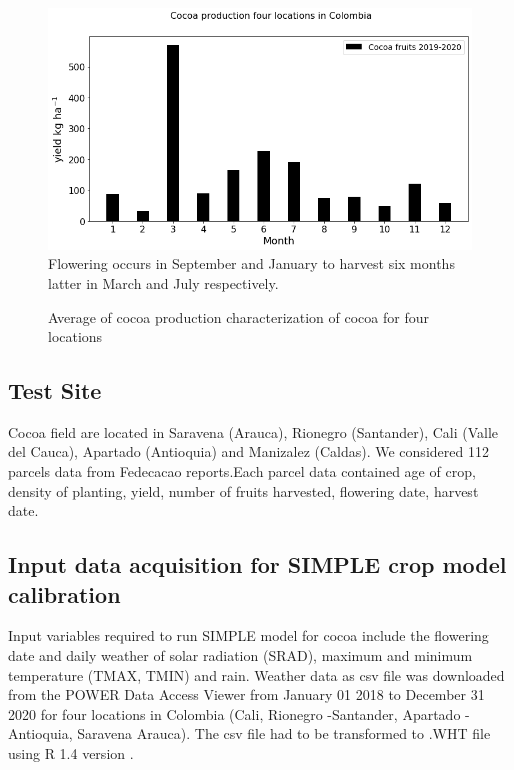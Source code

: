 \documentclass[gene,journal,article,submit,moreauthors,pdftex]{Definitions/mdpi}
\begin{document}
\begin{figure}[h]
	\centering
	\caption{\footnotesize {Average of cocoa production characterization of cocoa for four locations\\}}
	\includegraphics[scale=0.35]{images/yieldmonth.png}\\
	{\footnotesize Flowering occurs in September and January to harvest six months latter in March and July respectively.}
	\label{fig:yield}
\end{figure}
\newpage


\subsection{Test Site}
Cocoa field are located in Saravena (Arauca), Rionegro (Santander), Cali (Valle del Cauca), Apartado (Antioquia) and Manizalez (Caldas). We considered 112 parcels data from Fedecacao reports.Each parcel data contained age of crop, density of planting, yield, number of fruits harvested, flowering date, harvest date. 

\subsection{Input data acquisition for SIMPLE crop model calibration}
Input variables required to run SIMPLE model for cocoa include the flowering date and daily weather of solar radiation (SRAD), maximum and minimum temperature (TMAX, TMIN) and rain. Weather data as csv file was  downloaded from the POWER Data Access Viewer \citep{nasapower} from January 01 2018 to December 31 2020 for four locations in Colombia (Cali, Rionegro -Santander, Apartado - Antioquia, Saravena Arauca). The csv file had to be transformed to .WHT file using R 1.4 version \citep{Rstudio2020}. 
\end{document}
